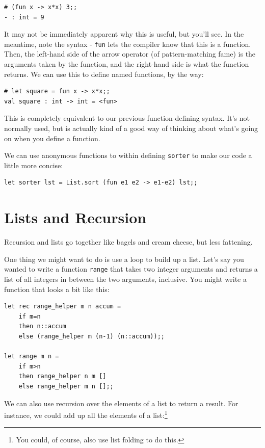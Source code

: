 \documentclass[10pt]{book}
\begin{document}
{\beforeverb
\begin{verbatim}
# (fun x -> x*x) 3;;
- : int = 9
\end{verbatim}
\afterverb

It may not be immediately apparent why this is useful, but you'll see.
In the meantime, note the syntax - {\tt fun} lets the compiler know that
this is a function. Then, the left-hand side of the arrow operator (of 
pattern-matching fame) is the arguments taken by the function, and the
right-hand side is what the function returns. We can use this to define
named functions, by the way:

\beforeverb
\begin{verbatim}
# let square = fun x -> x*x;;
val square : int -> int = <fun>
\end{verbatim}
\afterverb
This is completely equivalent to our previous function-defining syntax. It's
not normally used, but is actually kind of a good way of thinking about what's
going on when you define a function.

We can use anonymous functions to within defining {\tt sorter} to make our
code a little more concise:

\beforeverb
\begin{verbatim}
let sorter lst = List.sort (fun e1 e2 -> e1-e2) lst;; 
\end{verbatim}
\afterverb

\section{Lists and Recursion}

Recursion and lists go together like bagels and cream cheese, 
but less fattening.

One thing we might want to do is use a loop to build up a list. 
Let's say you wanted to write a function {\tt range} 
that takes two integer arguments and returns a list of all integers
in between the two arguments, inclusive. You might write a function 
that looks a bit like this:

\beforeverb
\begin{verbatim}
let rec range_helper m n accum = 
	if m=n
	then n::accum
	else (range_helper m (n-1) (n::accum));;

let range m n = 
	if m>n 
	then range_helper n m []
	else range_helper m n [];;
\end{verbatim}
\afterverb

We can also use recursion over the elements of a list 
to return a result. For instance, we could add up all 
the elements of a list:\footnote{You could, of course, 
also use list folding to do this.}

}
\end{document}
